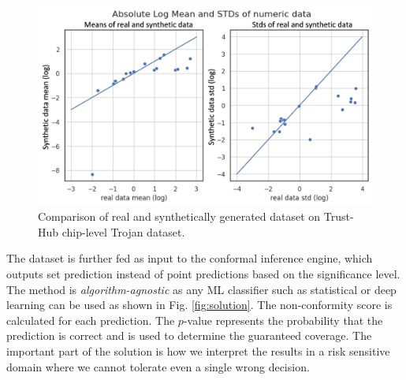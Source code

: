 \begin{figure}[!b]
  \includegraphics[width=1\linewidth]{figs/gan/real_fake.png}
  \caption{Comparison of real and synthetically generated dataset on Trust-Hub chip-level Trojan dataset.}
  \label{fig:gan1}
\end{figure}

 The dataset is further fed as input to the conformal inference engine, which outputs set prediction instead of point predictions based on the significance level. The method is \textit{algorithm-agnostic} as any ML classifier such as statistical or deep learning can be used as shown in Fig. \ref{fig:solution}. The non-conformity score is calculated for each prediction. The $p$-value represents the probability that the prediction is correct and is used to determine the guaranteed coverage. The important part of the solution is how we interpret the results in a risk sensitive domain where we cannot tolerate even a single wrong decision.

